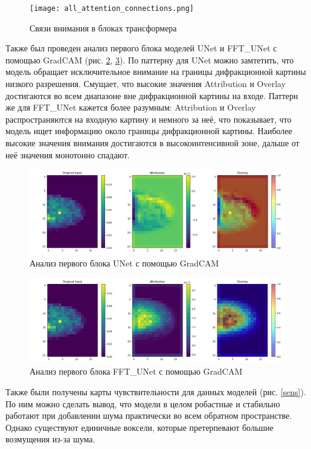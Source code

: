 \documentclass[a4paper,12pt]{article}
\begin{document}
{\begin{figure}[H]
    \centering
    \texttt{[image: all\_attention\_connections.png]}
    \caption{Связи внимания в блоках трансформера}
    \label{attention_maps}
\end{figure}

Также был проведен анализ первого блока моделей UNet и FFT\_UNet с помощью GradCAM (рис. \ref{gradU}, \ref{gradFFT}). По паттерну для UNet можно замтетить, что модель обращает исключительное внимание на границы дифракционной картины низкого разрешения. Смущает, что высокие значения Attribution и Overlay достигаются во всем диапазоне вне дифракционной картины на входе. Паттерн же для FFT\_UNet кажется более разумным: Attribution и Overlay распространяются на входную картину и немного за неё, что показывает, что модель ищет информацию около границы дифракционной картины. Наиболее высокие значения внимания достигаются в высокоинтенсивной зоне, дальше от неё значения монотонно спадают.

\begin{figure}[H]
    \centering
    \includegraphics[width=1\textwidth]{attribution_overlay.png}
    \caption{Анализ первого блока UNet с помощью GradCAM}
    \label{gradU}
\end{figure}

\begin{figure}[H]
    \centering
    \includegraphics[width=1\textwidth]{attribution_overlay_fft.png}
    \caption{Анализ первого блока FFT\_UNet с помощью GradCAM}
    \label{gradFFT}
\end{figure}

Также были получены карты чувствительности для данных моделей (рис. \ref{sens}). По ним можно сделать вывод, что модели в целом робастные и стабильно работают при добавлении шума практически во всем обратном пространстве. Однако существуют единичные воксели, которые претерпевают большие возмущения из-за шума. 


}
\end{document}
